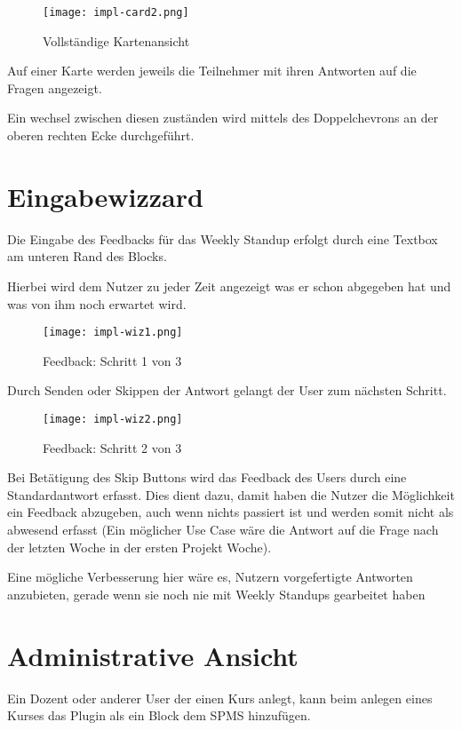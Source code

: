 \begin{figure}[H]
	\centering
	\texttt{[image: impl-card2.png]}
    \caption{Vollständige Kartenansicht}
	\label{fig:uncollapsedCard}
\end{figure}

Auf einer Karte werden jeweils die Teilnehmer mit ihren Antworten auf die Fragen angezeigt.

Ein wechsel zwischen diesen zuständen wird mittels des Doppelchevrons an der oberen rechten Ecke durchgeführt.

\section{Eingabewizzard}

Die Eingabe des Feedbacks für das Weekly Standup erfolgt durch eine Textbox am unteren Rand des Blocks.

Hierbei wird dem Nutzer zu jeder Zeit angezeigt was er schon abgegeben hat und was von ihm noch erwartet wird.

\begin{figure}[H]
	\centering
	\texttt{[image: impl-wiz1.png]}
    \caption{Feedback: Schritt 1 von 3}
	\label{fig:wizzard1}
\end{figure}

Durch Senden oder Skippen der Antwort gelangt der User zum nächsten Schritt.

\begin{figure}[H]
	\centering
	\texttt{[image: impl-wiz2.png]}
    \caption{Feedback: Schritt 2 von 3}
	\label{fig:wizzard2}
\end{figure}

Bei Betätigung des Skip Buttons wird das Feedback des Users durch eine Standardantwort erfasst. Dies dient dazu, damit haben die Nutzer die Möglichkeit ein Feedback abzugeben, auch wenn nichts passiert ist und werden somit nicht als abwesend erfasst (Ein möglicher Use Case wäre die Antwort auf die Frage nach der letzten Woche in der ersten Projekt Woche).

Eine mögliche Verbesserung hier wäre es, Nutzern vorgefertigte Antworten anzubieten, gerade wenn sie noch nie mit Weekly Standups gearbeitet haben

\section{Administrative Ansicht}

Ein Dozent oder anderer User der einen Kurs anlegt, kann beim anlegen eines Kurses das Plugin als ein Block dem \ac{SPMS} hinzufügen.\\

